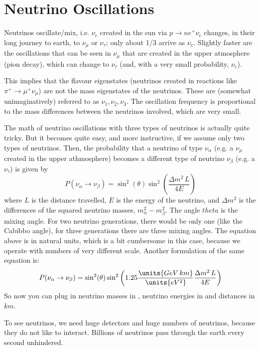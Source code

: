 \section{Neutrino Oscillations}
Neutrinos oscillate/mix, i.e. $\nu_e$ created in the sun via $p \to n e^+ \nu_e$ changes, in their long journey to earth, to $\nu_{\mu}$ or $\nu_{\tau}$; only about 1/3 arrive as $\nu_e$. Slightly faster are the oscillations that can be seen in $\nu_{\mu}$ that are created in the upper atmosphere (pion decay), which can change to $\nu_{\tau}$ (and, with a very small probability, $\nu_e$).

This implies that the flavour eigenstates (neutrinos created in reactions like $\pi^+ \to \mu^+ \nu_{\mu}$) are not the mass eigenstates of the neutrinos. These are (somewhat unimaginatively) referred to as $\nu_1, \nu_2, \nu_3$. The oscillation frequency is proportional to the mass differences between the neutrinos involved, which are very small.

The math of neutrino oscillations with three types of neutrinos is actually quite tricky. But it becomes quite easy, and more instructive, if we assume only two types of neutrinos. Then, the probability that a neutrino of type $\nu_{\alpha}$ (e.g. a $\nu_{\mu}$ created in the upper athmosphere) becomes a different type of neutrino $\nu_{\beta}$ (e.g. a $\nu_{\tau}$) is given by
\begin{equation}
    P(\nu_{\alpha} \to \nu_{\beta})
    =
    \sin^2(\theta) \sin^2\left( \frac{\Delta m^2 \,L}{4E} \right)
\end{equation}
where $L$ is the distance travelled, $E$ is the energy of the neutrino, and $\Delta m^2$ is the differences of the squared neutrino masses, $m_{\alpha}^2 - m_{\beta}^2$. The angle $theta$ is the mixing angle. For two neutrino generations, there would be only one (like the Cabibbo angle), for three generations there are three mixing angles. The equation above is in natural units, which is a bit cumbersome in this case, because we operate with numbers of very different scale. Another formulation of the same equation is:
\begin{equation}
    P(\nu_{\alpha} \to \nu_{\beta})
    =
    \sin^2(\theta) \sin^2\left( 1.25 \frac{\units{GeV\,km}}{\units{eV^2}}\frac{\Delta m^2 \,L}{4E} \right)
\end{equation}
So now you can plug in neutrino masses in , neutrino energies in  and distances in $km$.

To see neutrinos, we need huge detectors and huge numbers of neutrinos, because they do not like to interact. Billions of neutrinos pass through the earth every second unhindered.

